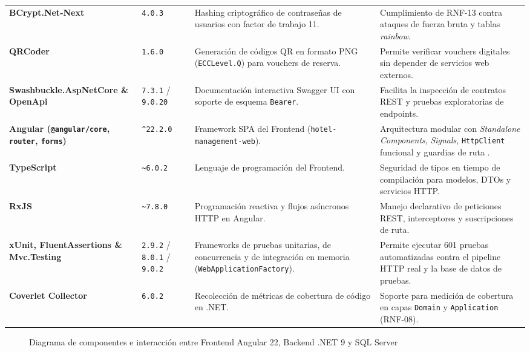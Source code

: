 \documentclass[12pt,a4paper]{article}
\begin{document}
\begin{longtable}{p{3.6cm} p{1.8cm} p{4.2cm} p{5.0cm}}
\textbf{BCrypt.Net-Next} & \texttt{4.0.3} & Hashing criptogr\'afico de contrase\~nas de usuarios con factor de trabajo 11. & Cumplimiento de RNF-13 contra ataques de fuerza bruta y tablas \textit{rainbow}.\\[0.12cm]
\textbf{QRCoder} & \texttt{1.6.0} & Generaci\'on de c\'odigos QR en formato PNG (\texttt{ECCLevel.Q}) para vouchers de reserva. & Permite verificar vouchers digitales sin depender de servicios web externos.\\[0.12cm]
\textbf{Swashbuckle.AspNetCore \& OpenApi} & \texttt{7.3.1} / \texttt{9.0.20} & Documentaci\'on interactiva Swagger UI con soporte de esquema \texttt{Bearer}. & Facilita la inspecci\'on de contratos REST y pruebas exploratorias de endpoints.\\[0.12cm]
\textbf{Angular (\texttt{@angular/core}, \texttt{router}, \texttt{forms})} & \texttt{\^{}22.2.0} & Framework SPA del Frontend (\texttt{hotel-management-web}). & Arquitectura modular con \textit{Standalone Components}, \textit{Signals}, \texttt{HttpClient} funcional y guardias de ruta \cite{angular_docs}.\\[0.12cm]
\textbf{TypeScript} & \texttt{\~{}6.0.2} & Lenguaje de programaci\'on del Frontend. & Seguridad de tipos en tiempo de compilaci\'on para modelos, DTOs y servicios HTTP.\\[0.12cm]
\textbf{RxJS} & \texttt{\~{}7.8.0} & Programaci\'on reactiva y flujos as\'incronos HTTP en Angular. & Manejo declarativo de peticiones REST, interceptores y suscripciones de ruta.\\[0.12cm]
\textbf{xUnit, FluentAssertions \& Mvc.Testing} & \texttt{2.9.2} / \texttt{8.0.1} / \texttt{9.0.2} & Frameworks de pruebas unitarias, de concurrencia y de integraci\'on en memoria (\texttt{WebApplicationFactory}). & Permite ejecutar 601 pruebas automatizadas contra el pipeline HTTP real y la base de datos de pruebas.\\[0.12cm]
\textbf{Coverlet Collector} & \texttt{6.0.2} & Recolecci\'on de m\'etricas de cobertura de c\'odigo en .NET. & Soporte para medici\'on de cobertura en capas \texttt{Domain} y \texttt{Application} (RNF-08).\\
\end{longtable}

\begin{figure}[H]
    \centering
    
    \caption{Diagrama de componentes e interacci\'on entre Frontend Angular 22, Backend .NET 9 y SQL Server}
    \label{fig:diagrama_componentes}
\end{figure}
\end{document}
